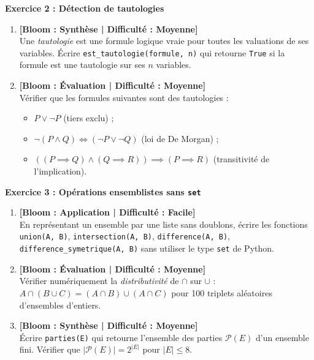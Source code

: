 \documentclass[12pt,a4paper]{report}
\begin{document}
\noindent\textbf{Exercice 2 : Détection de tautologies}
\begin{enumerate}
    \item \textbf{[Bloom : Synthèse | Difficulté : Moyenne]} \\
    Une \emph{tautologie} est une formule logique vraie pour toutes les valuations de ses variables. Écrire \texttt{est\_tautologie(formule, n)} qui retourne \texttt{True} si la formule est une tautologie sur ses $n$ variables.
    \item \textbf{[Bloom : Évaluation | Difficulté : Moyenne]} \\
    Vérifier que les formules suivantes sont des tautologies :
    \begin{itemize}
        \item $P \lor \neg P$ (tiers exclu) ;
        \item $\neg(P \land Q) \iff (\neg P \lor \neg Q)$ (loi de De Morgan) ;
        \item $((P \implies Q) \land (Q \implies R)) \implies (P \implies R)$ (transitivité de l'implication).
    \end{itemize}
\end{enumerate}

\vspace{0.3cm}

\noindent\textbf{Exercice 3 : Opérations ensemblistes sans \texttt{set}}
\begin{enumerate}
    \item \textbf{[Bloom : Application | Difficulté : Facile]} \\
    En représentant un ensemble par une liste sans doublons, écrire les fonctions \texttt{union(A, B)}, \texttt{intersection(A, B)}, \texttt{difference(A, B)}, \texttt{difference\_symetrique(A, B)} sans utiliser le type \texttt{set} de Python.
    \item \textbf{[Bloom : Évaluation | Difficulté : Moyenne]} \\
    Vérifier numériquement la \emph{distributivité} de $\cap$ sur $\cup$ : $A \cap (B \cup C) = (A \cap B) \cup (A \cap C)$ pour 100 triplets aléatoires d'ensembles d'entiers.
    \item \textbf{[Bloom : Synthèse | Difficulté : Moyenne]} \\
    Écrire \texttt{parties(E)} qui retourne l'ensemble des parties $\mathcal{P}(E)$ d'un ensemble fini. Vérifier que $|\mathcal{P}(E)| = 2^{|E|}$ pour $|E| \le 8$.
\end{enumerate}
\end{document}
